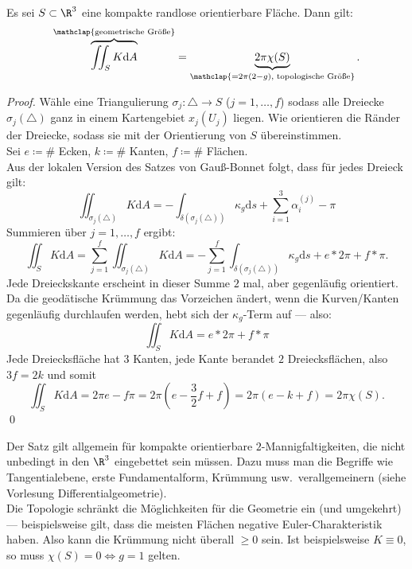 \begin{theorem}
  Es sei \( S \subset \R^3 \) eine kompakte randlose orientierbare Fläche. Dann gilt:
  \begin{equation*}
    \overbrace{\iint_S K\text{d}A}^{\mathclap{\text{geometrische Größe}}} = \underbrace{2\pi\chi(S)}_{\mathclap{=2\pi(2-g)\text{, topologische Größe}}}\text{.}
  \end{equation*}
  \begin{proof}
    Wähle eine Triangulierung \( \sigma_j: \triangle \to S \) (\( j = 1,\dots,f \)) sodass alle Dreiecke \( \sigma_j(\triangle) \) ganz in einem Kartengebiet \( x_j(U_j) \) liegen. Wie orientieren die Ränder der Dreiecke, sodass sie mit der Orientierung von \( S \) übereinstimmen. \\
    Sei \( e \coloneqq \# \) Ecken, \( k \coloneqq \# \) Kanten, \( f \coloneqq \# \) Flächen. \\
    Aus der lokalen Version des Satzes von Gauß-Bonnet folgt, dass für jedes Dreieck gilt:
    \begin{equation*}
      \iint_{\sigma_j(\triangle)}K\text{d}A = -\int_{\delta(\sigma_j(\triangle))}\kappa_g\text{d}s + \sum_{i = 1}^3 \alpha_i^{(j)} - \pi
    \end{equation*}
    Summieren über \( j = 1,\dots,f \) ergibt:
    \begin{equation*}
      \iint_S K\text{d}A = \sum_{j=1}^f\iint_{\sigma_j(\triangle)}K\text{d}A = -\sum_{j=1}^f\int_{\delta(\sigma_j(\triangle))}\kappa_g\text{d}s + e*2\pi + f*\pi \text{.}
    \end{equation*}
    Jede Dreieckskante erscheint in dieser Summe \( 2 \) mal, aber gegenläufig orientiert. Da die geodätische Krümmung das Vorzeichen ändert, wenn die Kurven/Kanten gegenläufig durchlaufen werden, hebt sich der \( \kappa_g \)-Term auf --- also:
    \begin{equation*}
      \iint_S K\text{d}A = e*2\pi + f*\pi
    \end{equation*}
    Jede Dreiecksfläche hat \( 3 \) Kanten, jede Kante berandet \( 2 \) Dreiecksflächen, also \( 3f = 2k \) und somit
    \begin{equation*}
      \iint_S K\text{d}A = 2\pi e - f\pi = 2\pi(e - \frac{3}{2}f + f) = 2\pi(e-k+f) = 2\pi\chi(S)\text{.}
    \end{equation*} \qed{}
  \end{proof}
\end{theorem}

\begin{remark}
  Der Satz gilt allgemein für kompakte orientierbare \( 2 \)-Mannigfaltigkeiten, die nicht unbedingt in den \( \R^3 \) eingebettet sein müssen. Dazu muss man die Begriffe wie Tangentialebene, erste Fundamentalform, Krümmung usw.\ verallgemeinern (siehe Vorlesung Differentialgeometrie). \\
  Die Topologie schränkt die Möglichkeiten für die Geometrie ein (und umgekehrt) --- beispielsweise gilt, dass die meisten Flächen negative Euler-Charakteristik haben. Also kann die Krümmung nicht überall \( \geq 0 \) sein. Ist beispielsweise \( K \equiv 0 \), so muss \( \chi(S) = 0 \Leftrightarrow g = 1 \) gelten.
\end{remark}

